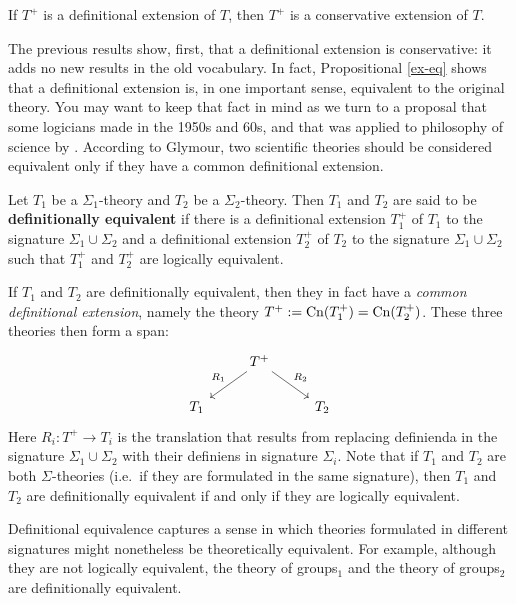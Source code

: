 \begin{cor} If $T^+$ is a definitional extension of $T$, then $T^+$ is
  a conservative extension of $T$. \label{wilfrid} \end{cor}

The previous results show, first, that a definitional extension is
conservative: it adds no new results in the old vocabulary.  In fact,
Propositional \ref{ex-eq} shows that a definitional extension is, in
one important sense, equivalent to the original theory.  You may want
to keep that fact in mind as we turn to a proposal that some logicians
made in the 1950s and 60s, and that was applied to philosophy of
science by \cite{glymour1970}.  According to Glymour, two scientific
theories should be considered equivalent only if they have a common
definitional extension.

\begin{defn} \label{df:cde} Let $T_1$ be a $\Sigma_1$-theory and $T_2$
  be a $\Sigma_2$-theory.  Then $T_1$ and $T_2$ are said to be
  \textbf{definitionally equivalent} if there is a definitional
  extension $T_1^+$ of $T_1$ to the signature $\Sigma_1\cup\Sigma_2$
  and a definitional extension $T_2^+$ of $T_2$ to the signature
  $\Sigma_1\cup\Sigma_2$ such that $T_1^+$ and $T_2^+$ are logically
  equivalent.
\end{defn}

If $T_1$ and $T_2$ are definitionally equivalent, then they in fact
have a \emph{common definitional extension}, namely the theory
$T^+:=\mathrm{Cn}(T_1^+)=\mathrm{Cn}(T_2^+)$.  These three theories then form a
span:
\[ \begin{tikzcd} & T^+  \arrow{dr}{R_2} & \\
    T_1 \arrow[<-]{ur}{R_1} & & T_2 \end{tikzcd} \] Here $R_i:T^+\to T_i$ is the
translation that results from replacing definienda in the signature
$\Sigma _1\cup \Sigma _2$ with their definiens in signature
$\Sigma _i$.  Note that if $T_1$ and $T_2$ are both $\Sigma$-theories
(i.e.\ if they are formulated in the same signature), then $T_1$ and
$T_2$ are definitionally equivalent if and only if they are logically
equivalent.

Definitional equivalence captures a sense in which theories formulated
in different signatures might nonetheless be theoretically
equivalent. For example, although they are not logically equivalent,
the theory of groups$_1$ and the theory of groups$_2$ are
definitionally equivalent.

